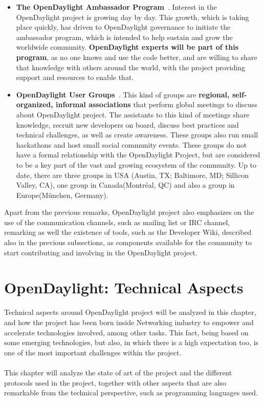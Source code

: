 \documentclass[a4paper, 12pt]{book}
\begin{document}
\begin{enumerate}
\begin{itemize}
\item{\textbf{The OpenDaylight Ambassador Program}~\cite{OpenDaylightAmbassadorProgram}}. Interest in the OpenDaylight project is growing day by day. This growth, which is taking place quickly, has driven to OpenDaylight governance to initiate the ambassador program, which is intended to help sustain and grow the worldwide community. \textbf{OpenDaylight experts will be part of this program}, as no one knows and use the code better, and are willing to share that knowledge with others around the world, with the project providing support and resources to enable that.
\item{\textbf{OpenDaylight User Groups}~\cite{OpenDaylightUserGroups}}. This kind of groups are \textbf{regional, self-organized, informal associations} that perform global meetings to discuss about OpenDaylight project. The assistants to this kind of meetings share knowledge, recruit new developers on board, discuss best practices and technical challenges, as well as create awareness. These groups also run small hackathons and host small social community events. These groups do not have a formal relationship with the OpenDaylight Project, but are considered to be a key part of the vast and growing ecosystem of the community. Up to date, there are three groups in USA (Austin, TX; Baltimore, MD; Sillicon Valley, CA), one group in Canada(Montréal, QC) and also a group in Europe(München, Germany).
\end{itemize}

Apart from the previous remarks, OpenDaylight project also emphasizes on the use of the communication channels, such as mailing list or IRC channel, remarking as well the existence of tools, such as the Developer Wiki, described also in the previous subsections, as components available for the community to start contributing and involving in the OpenDaylight project.
\end{enumerate}

\chapter{OpenDaylight: Technical Aspects}
\label{chap:odltechnical}
Technical aspects around OpenDaylight project will be analyzed in this chapter, and how the project has been born inside Networking industry to empower and accelerate technologies involved, among other tasks. This fact, being based on some emerging technologies, but also, in which there is a high expectation too, is one of the most important challenges within the project.\\
\\
This chapter will analyze the state of art of the project and the different protocols used in the project, together with other aspects that are also remarkable from the technical perspective, such as programming languages used.
\end{document}
